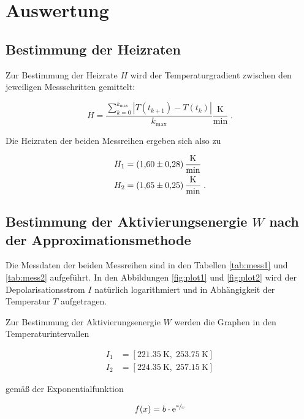 \section{Auswertung}
\label{sec:Auswertung}

\subsection{Bestimmung der Heizraten}

Zur Bestimmung der Heizrate $H$ wird der Temperaturgradient zwischen den jeweiligen Messschritten gemittelt:

\begin{equation}
  H = \frac{ \sum_{k=0}^{k_\text{max}} |T(t_{k+1}) - T(t_k)|}{k_\text{max}} \frac{\si{\kelvin}}{\si{\minute}} \; .
\end{equation}

Die Heizraten der beiden Messreihen ergeben sich also zu

\begin{align*}
  H_1 &= \SI{1.60 +- 0.28}{\kelvin\per\minute} \\
  H_2 &= \SI{1.65 +- 0.25}{\kelvin\per\minute} \; .
\end{align*}

\subsection{Bestimmung der Aktivierungsenergie $W$ nach der Approximationsmethode}

Die Messdaten der beiden Messreihen sind in den Tabellen \ref{tab:mess1} und \ref{tab:mess2} aufgeführt.
In den Abbildungen \ref{fig:plot1} und \ref{fig:plot2} wird der Depolarisationsstrom $I$ natürlich logarithmiert und in Abhängigkeit der Temperatur $T$
aufgetragen.

Zur Bestimmung der Aktivierungsenergie $W$ werden die Graphen in den Temperaturintervallen

\begin{align*}
  I_1 &= [\SI{221.35}{\kelvin}, \; \SI{253.75}{\kelvin}] \\
  I_2 &= [\SI{224.35}{\kelvin}, \; \SI{257.15}{\kelvin}]
\end{align*}

gemäß der Exponentialfunktion 

\begin{equation}
  \label{eqn:fit}
  f(x) = b \cdot \text{e}^{\sfrac{a}{x}}
\end{equation}

